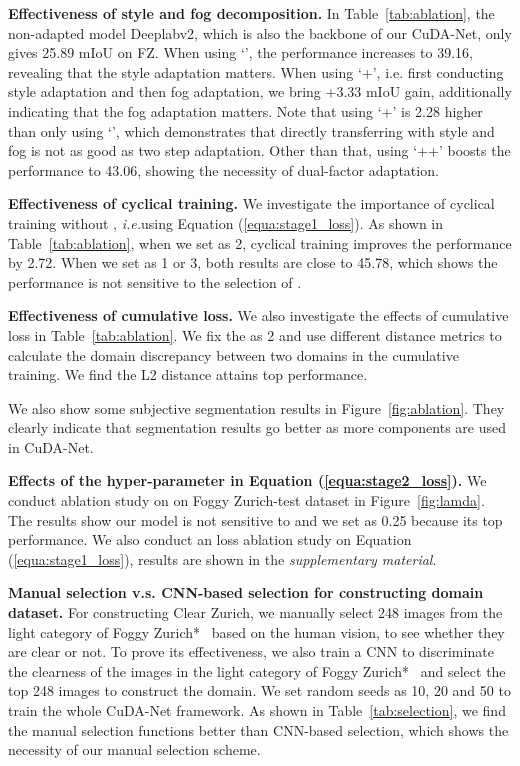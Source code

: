 \documentclass[10pt,twocolumn,letterpaper]{article}
\def\ie{\textit{i.e.}}
\begin{document}
\noindent\textbf{Effectiveness of style and fog decomposition.} In Table~\ref{tab:ablation}, the non-adapted model Deeplabv2, which is also the backbone of our CuDA-Net, only gives 25.89 mIoU on FZ. When using `', the performance increases to 39.16, revealing that the style adaptation matters. When using `+', i.e. first conducting style adaptation and then fog adaptation, we bring +3.33 mIoU gain, additionally indicating that the fog adaptation matters.
Note that using `+' is 2.28 higher than only using `', which demonstrates that directly transferring with style and fog is not as good as two step adaptation. Other than that, using `++' boosts the performance to 43.06, showing the necessity of dual-factor adaptation.

\noindent\textbf{Effectiveness of cyclical training.} We investigate the importance of cyclical training without , \ie using Equation (\ref{equa:stage1_loss}). As shown in Table~\ref{tab:ablation}, when we set  as 2, cyclical training improves the performance by 2.72. When we set  as 1 or 3, both results are close to 45.78, which shows the performance is not sensitive to the selection of .

\noindent\textbf{Effectiveness of cumulative loss.} We also investigate the effects of cumulative loss  in Table~\ref{tab:ablation}. We fix the  as 2 and use different distance metrics to calculate the domain discrepancy between two domains in the cumulative training. We find the L2 distance attains top performance.



We also show some subjective segmentation results in Figure~\ref{fig:ablation}. They clearly indicate that segmentation results go better as more components are used in CuDA-Net.

\noindent\textbf{Effects of the hyper-parameter  in Equation (\ref{equa:stage2_loss}).} We conduct ablation study on  on Foggy Zurich-test dataset in Figure~\ref{fig:lamda}. The results show our model is not sensitive to  and we set  as 0.25 because its top performance. We also conduct an loss ablation study on Equation (\ref{equa:stage1_loss}), results are shown in the \emph{supplementary material}.

\noindent\textbf{Manual selection v.s. CNN-based selection for constructing  domain dataset.}
For constructing Clear Zurich, we manually select 248 images from the light category of Foggy Zurich*~\cite{sakaridis2018model} based on the human vision, to see whether they are clear or not. To prove its effectiveness, we also train a CNN to discriminate the clearness of the images in the light category of Foggy Zurich*~\cite{sakaridis2018model} and select the top 248 images to construct the  domain. We set random seeds as 10, 20 and 50 to train the whole CuDA-Net framework. As shown in Table~\ref{tab:selection}, we find the manual selection functions better than CNN-based selection, which shows the necessity of our manual selection scheme.
\end{document}
